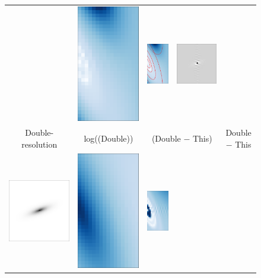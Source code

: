 \documentclass[11pt,letterpaper]{aastex63}
\begin{document}
\begin{figure}[p!]
\begin{center}
\begin{tabular}{@{}ccccc@{}}
      &
      \includegraphics[height=0.24\textwidth]{lopass-diff-pixmine-fourier}
      &
      \includegraphics[height=0.24\textwidth]{lopass-diff-pixmine-fourier-ann}
      &
      \includegraphics[height=0.24\textwidth]{lopass-diff-pixmine-pix}
      \\
      Double-resolution
      &
      log(\F(Double))
      &
      \multicolumn{2}{c}{\F(Double $-$ This)}
      &
      Double $-$ This
      \\
      \includegraphics[height=0.24\textwidth]{lopass-dpix-pix}
      &
      \includegraphics[height=0.24\textwidth]{lopass-dclip-logfourier}
      &
      \includegraphics[height=0.24\textwidth]{lopass-diff-dclipmine-fourier}

\end{tabular}
\end{center}
\end{figure}
\end{document}
